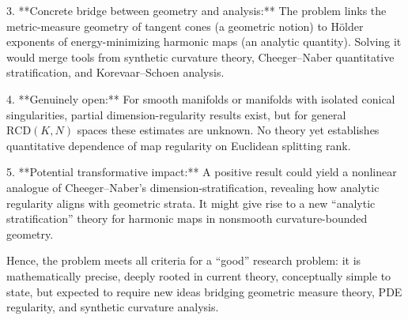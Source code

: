 3. **Concrete bridge between geometry and analysis:**  
   The problem links the metric-measure geometry of tangent cones (a geometric notion) to Hölder exponents of energy-minimizing harmonic maps (an analytic quantity). Solving it would merge tools from synthetic curvature theory, Cheeger–Naber quantitative stratification, and Korevaar–Schoen analysis.

4. **Genuinely open:**  
   For smooth manifolds or manifolds with isolated conical singularities, partial dimension-regularity results exist, but for general \(\mathrm{RCD}(K,N)\) spaces these estimates are unknown. No theory yet establishes quantitative dependence of map regularity on Euclidean splitting rank.

5. **Potential transformative impact:**  
   A positive result could yield a nonlinear analogue of Cheeger–Naber’s dimension‐stratification, revealing how analytic regularity aligns with geometric strata. It might give rise to a new “analytic stratification” theory for harmonic maps in nonsmooth curvature-bounded geometry.

Hence, the problem meets all criteria for a “good” research problem: it is mathematically precise, deeply rooted in current theory, conceptually simple to state, but expected to require new ideas bridging geometric measure theory, PDE regularity, and synthetic curvature analysis.